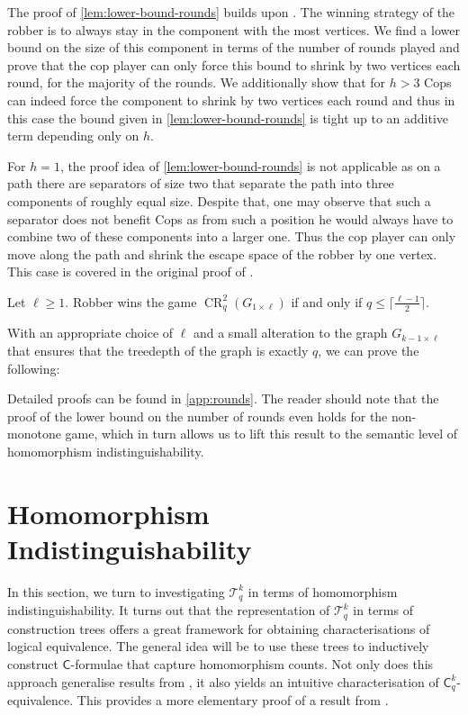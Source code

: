 \documentclass[a4paper,UKenglish,cleveref, autoref, thm-restate]{lipics-v2021}
\newcommand{\Ekq}{\ensuremath{\mathcal{T}_{q}^{k}}}
\newcommand{\lC} {\ensuremath{\mathsf C}}
\DeclareMathOperator{\CR}{CR}
\newcommand{\grid}[2]{\ensuremath{G_{#1 \times #2}}}
\begin{document}
The proof of \cref{lem:lower-bound-rounds} builds upon \cite{Furer01}.
The winning strategy of the robber is to always stay in the component with the most vertices.
We find a lower bound on the size of this component in terms of the number of rounds played and prove that the cop player can only force this bound to shrink by two vertices each round, for the majority of the rounds.
We additionally show that for $h>3$ Cops can indeed force the component to shrink by two vertices each round and thus in this case the bound given in \cref{lem:lower-bound-rounds} is tight up to an additive term depending only on $h$.

For $h=1$, the proof idea of \cref{lem:lower-bound-rounds} is not applicable as on a path there are separators of size two that separate the path into three components of roughly equal size.
Despite that, one may observe that such a separator does not benefit Cops as from such a position he would always have to combine two of these components into a larger one.
Thus the cop player can only move along the path and shrink the escape space of the robber by one vertex.
This case is covered in the original proof of \cite{Furer01}.

\begin{lemma}
	\label{lem:rounds-path}
	Let $\ell\geq 1$. Robber wins the game $\CR_q^2(\grid{1}{\ell})$ if and only if $q\leq\lceil \frac{\ell-1}{2}\rceil$.
\end{lemma}

With an appropriate choice of $\ell$ and a small alteration to the graph \grid{k-1}{\ell} that ensures that the treedepth of the graph is exactly $q$, we can prove the following:

\ekqtwtdsyntax*

Detailed proofs can be found in \cref{app:rounds}.
The reader should note that the proof of the lower bound on the number of rounds even holds for the non-monotone game, which in turn allows us to lift this result to the semantic level of homomorphism indistinguishability.
 
\section{Homomorphism Indistinguishability} \label{sec:homind}
In this section, we turn to investigating $\Ekq$ in terms of homomorphism indistinguishability.
It turns out that the representation of $\Ekq$ in terms of construction trees offers a great framework for obtaining characterisations of logical equivalence. The general idea will be to use these trees to inductively construct $\lC$-formulae that capture homomorphism counts. Not only does this approach generalise results from \cite{dvorak_recognizing_2010,grohe_counting_2020}, it also yields an intuitive characterisation of $\lC^k_q$-equivalence. This provides a more elementary proof of a result from \cite{dawar_lovasz-type_2021}.
\end{document}
